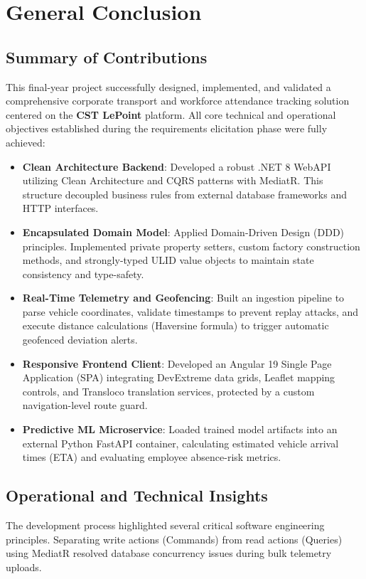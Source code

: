 \chapter*{General Conclusion}

\section*{Summary of Contributions}
This final-year project successfully designed, implemented, and validated a comprehensive corporate transport and workforce attendance tracking solution centered on the \textbf{CST LePoint} platform. All core technical and operational objectives established during the requirements elicitation phase were fully achieved:
\begin{itemize}
  \item \textbf{Clean Architecture Backend}: Developed a robust .NET 8 WebAPI utilizing Clean Architecture and CQRS patterns with MediatR. This structure decoupled business rules from external database frameworks and HTTP interfaces.
  \item \textbf{Encapsulated Domain Model}: Applied Domain-Driven Design (DDD) principles. Implemented private property setters, custom factory construction methods, and strongly-typed ULID value objects to maintain state consistency and type-safety.
  \item \textbf{Real-Time Telemetry and Geofencing}: Built an ingestion pipeline to parse vehicle coordinates, validate timestamps to prevent replay attacks, and execute distance calculations (Haversine formula) to trigger automatic geofenced deviation alerts.
  \item \textbf{Responsive Frontend Client}: Developed an Angular 19 Single Page Application (SPA) integrating DevExtreme data grids, Leaflet mapping controls, and Transloco translation services, protected by a custom navigation-level route guard.
  \item \textbf{Predictive ML Microservice}: Loaded trained model artifacts into an external Python FastAPI container, calculating estimated vehicle arrival times (ETA) and evaluating employee absence-risk metrics.
\end{itemize}

\section*{Operational and Technical Insights}
The development process highlighted several critical software engineering principles. Separating write actions (Commands) from read actions (Queries) using MediatR resolved database concurrency issues during bulk telemetry uploads. 


